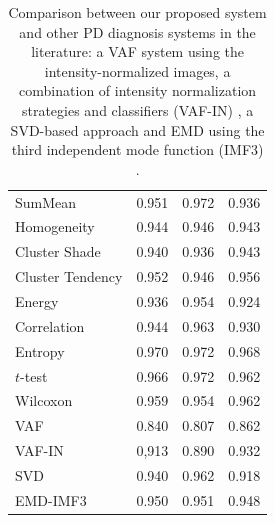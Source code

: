 \begin{table}[ht]
	\centering
	\begin{tabular}{lrrr}
		\toprule
		\tableheadline{System} & \tableheadline{Acc} & \tableheadline{Sens} & \tableheadline{Spec} \\ \midrule
		SumMean                &               0.951 &                0.972 &                0.936 \\
		Homogeneity            &               0.944 &                0.946 &                0.943 \\
		Cluster Shade          &               0.940 &                0.936 &                0.943 \\
		Cluster Tendency       &               0.952 &                0.946 &                0.956 \\
		Energy                 &               0.936 &                0.954 &                0.924 \\
		Correlation            &               0.944 &                0.963 &                0.930 \\ \midrule
		Entropy                &               0.970 &                0.972 &                0.968 \\
		$t$-test               &               0.966 &                0.972 &                0.962 \\
		Wilcoxon               &               0.959 &                0.954 &                0.962 \\ \midrule
		VAF                    &               0.840 &                0.807 &                0.862 \\
		VAF-IN                 &               0,913 &                0.890 &                0.932 \\
		SVD                    &               0.940 &                0.962 &                0.918 \\
		EMD-IMF3               &               0.950 &                0.951 &                0.948 \\ \bottomrule
	\end{tabular}
	\vspace{10pt}
	\caption[Comparison between our proposed system and other \acs{PD} diagnosis systems in the literature.]{Comparison between our proposed system and other \acs{PD} diagnosis systems in the literature: a \acs{VAF} system using the intensity-normalized images,  a combination of intensity normalization strategies and classifiers (\acs{VAF}-IN) \cite{Illan2012}, a \acs{SVD}-based approach \cite{Segovia2012} and EMD using the third independent mode function (IMF3) \cite{Rojas2012}.}
	\label{tab:comparison}
\end{table}

